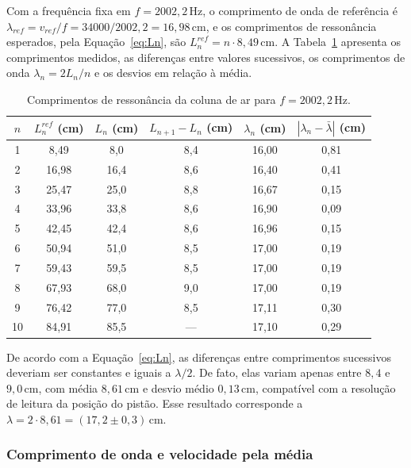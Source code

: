 \documentclass[12pt, a4paper]{article}
\newcommand{\un}[1]{\,\mathrm{#1}}
\newcommand{\fonte}[1]{\par\vspace{2pt}{\footnotesize Fonte: #1}}
\begin{document}
Com a frequência fixa em $f=2002{,}2\un{Hz}$, o comprimento de onda de referência é $\lambda_{ref}=v_{ref}/f=34000/2002{,}2=16{,}98\un{cm}$, e os comprimentos de ressonância esperados, pela Equação~\eqref{eq:Ln}, são $L_n^{ref}=n\cdot8{,}49\un{cm}$. A Tabela~\ref{tab:som_L} apresenta os comprimentos medidos, as diferenças entre valores sucessivos, os comprimentos de onda $\lambda_n=2L_n/n$ e os desvios em relação à média.

\begin{table}[H]
\centering
\caption{Comprimentos de ressonância da coluna de ar para $f=2002{,}2\un{Hz}$.}
\label{tab:som_L}
\begin{tabular}{cccccc}
\toprule
$n$ & $L_n^{ref}$ (cm) & $L_n$ (cm) & $L_{n+1}-L_n$ (cm) & $\lambda_n$ (cm) & $|\lambda_n-\bar{\lambda}|$ (cm) \\
\midrule
1 & 8,49 & 8,0 & 8,4 & 16,00 & 0,81 \\
2 & 16,98 & 16,4 & 8,6 & 16,40 & 0,41 \\
3 & 25,47 & 25,0 & 8,8 & 16,67 & 0,15 \\
4 & 33,96 & 33,8 & 8,6 & 16,90 & 0,09 \\
5 & 42,45 & 42,4 & 8,6 & 16,96 & 0,15 \\
6 & 50,94 & 51,0 & 8,5 & 17,00 & 0,19 \\
7 & 59,43 & 59,5 & 8,5 & 17,00 & 0,19 \\
8 & 67,93 & 68,0 & 9,0 & 17,00 & 0,19 \\
9 & 76,42 & 77,0 & 8,5 & 17,11 & 0,30 \\
10 & 84,91 & 85,5 & --- & 17,10 & 0,29 \\
\bottomrule
\end{tabular}
\fonte{Elaborada pelos autores.}
\end{table}

De acordo com a Equação~\eqref{eq:Ln}, as diferenças entre comprimentos sucessivos deveriam ser constantes e iguais a $\lambda/2$. De fato, elas variam apenas entre $8{,}4$ e $9{,}0\un{cm}$, com média $8{,}61\un{cm}$ e desvio médio $0{,}13\un{cm}$, compatível com a resolução de leitura da posição do pistão. Esse resultado corresponde a $\lambda=2\cdot8{,}61=(17{,}2\pm0{,}3)\un{cm}$.

\subsubsection{Comprimento de onda e velocidade pela média}
\end{document}
